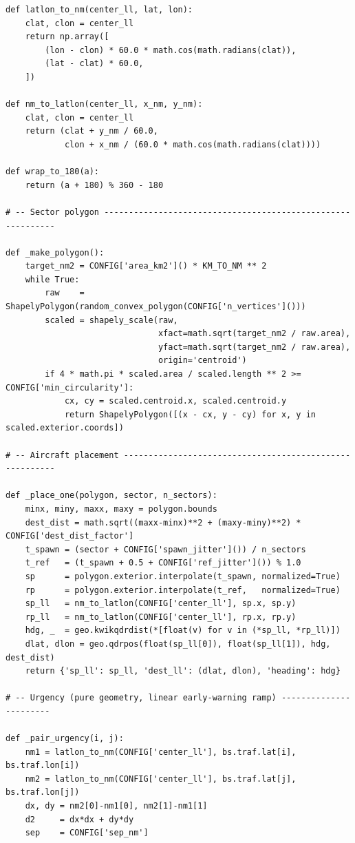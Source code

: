 \documentclass[10pt, a4paper]{article}
\begin{document}
\begin{lstlisting}[caption={v3\_simple\_env.py --- ATCO conflict-resolution environment}, label=lst:env]
def latlon_to_nm(center_ll, lat, lon):
    clat, clon = center_ll
    return np.array([
        (lon - clon) * 60.0 * math.cos(math.radians(clat)),
        (lat - clat) * 60.0,
    ])

def nm_to_latlon(center_ll, x_nm, y_nm):
    clat, clon = center_ll
    return (clat + y_nm / 60.0,
            clon + x_nm / (60.0 * math.cos(math.radians(clat))))

def wrap_to_180(a):
    return (a + 180) % 360 - 180

# -- Sector polygon ------------------------------------------------------------

def _make_polygon():
    target_nm2 = CONFIG['area_km2']() * KM_TO_NM ** 2
    while True:
        raw    = ShapelyPolygon(random_convex_polygon(CONFIG['n_vertices']()))
        scaled = shapely_scale(raw,
                               xfact=math.sqrt(target_nm2 / raw.area),
                               yfact=math.sqrt(target_nm2 / raw.area),
                               origin='centroid')
        if 4 * math.pi * scaled.area / scaled.length ** 2 >= CONFIG['min_circularity']:
            cx, cy = scaled.centroid.x, scaled.centroid.y
            return ShapelyPolygon([(x - cx, y - cy) for x, y in scaled.exterior.coords])

# -- Aircraft placement --------------------------------------------------------

def _place_one(polygon, sector, n_sectors):
    minx, miny, maxx, maxy = polygon.bounds
    dest_dist = math.sqrt((maxx-minx)**2 + (maxy-miny)**2) * CONFIG['dest_dist_factor']
    t_spawn = (sector + CONFIG['spawn_jitter']()) / n_sectors
    t_ref   = (t_spawn + 0.5 + CONFIG['ref_jitter']()) % 1.0
    sp      = polygon.exterior.interpolate(t_spawn, normalized=True)
    rp      = polygon.exterior.interpolate(t_ref,   normalized=True)
    sp_ll   = nm_to_latlon(CONFIG['center_ll'], sp.x, sp.y)
    rp_ll   = nm_to_latlon(CONFIG['center_ll'], rp.x, rp.y)
    hdg, _  = geo.kwikqdrdist(*[float(v) for v in (*sp_ll, *rp_ll)])
    dlat, dlon = geo.qdrpos(float(sp_ll[0]), float(sp_ll[1]), hdg, dest_dist)
    return {'sp_ll': sp_ll, 'dest_ll': (dlat, dlon), 'heading': hdg}

# -- Urgency (pure geometry, linear early-warning ramp) -----------------------

def _pair_urgency(i, j):
    nm1 = latlon_to_nm(CONFIG['center_ll'], bs.traf.lat[i], bs.traf.lon[i])
    nm2 = latlon_to_nm(CONFIG['center_ll'], bs.traf.lat[j], bs.traf.lon[j])
    dx, dy = nm2[0]-nm1[0], nm2[1]-nm1[1]
    d2     = dx*dx + dy*dy
    sep    = CONFIG['sep_nm']


\end{lstlisting}
\end{document}
